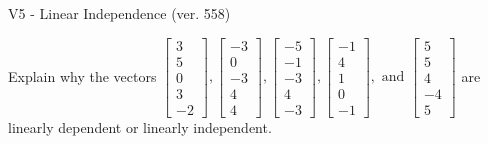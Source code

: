 \begin{exercise}
  \begin{exerciseTitle}V5 - Linear Independence (ver. 558)\end{exerciseTitle}
  \begin{exerciseStatement}
    Explain why the vectors \(\left[\begin{array}{r}
3 \\
5 \\
0 \\
3 \\
-2
\end{array}\right] , \left[\begin{array}{r}
-3 \\
0 \\
-3 \\
4 \\
4
\end{array}\right] , \left[\begin{array}{r}
-5 \\
-1 \\
-3 \\
4 \\
-3
\end{array}\right] , \left[\begin{array}{r}
-1 \\
4 \\
1 \\
0 \\
-1
\end{array}\right] , \text{ and } \left[\begin{array}{r}
5 \\
5 \\
4 \\
-4 \\
5
\end{array}\right]\) are linearly dependent or linearly independent.	



\end{exerciseStatement}
\end{exercise}
